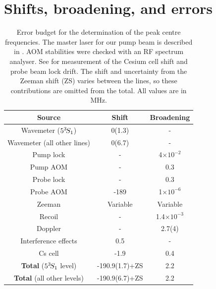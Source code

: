 

\section{Shifts, broadening, and errors}




\begin{table}
\centering
  \begin{tabular}{c c c}
      \hline\hline
          Source & Shift & Broadening  \\
      \hline
          Wavemeter ($5^{3\!} S_1$)& 0(1.3) & - \\
          Wavemeter (all other lines)& 0(6.7) & - \\
          Pump lock & - & 4$\times10^{-2}$ \\
          Pump AOM & - & 0.3 \\
          Probe lock & - & 0.3\\
          Probe AOM & -189 & 1$\times10^{-6}$\\
          Zeeman & Variable & Variable \\
          Recoil & - & 1.4$\times 10^{-3}$ \\ %
          Doppler & - & 2.7(4) \\
          Interference effects & 0.5 & - \\ 
          Cs cell & -1.9 & 0.4 \\
          \textbf{Total} ($5^{3\!} S_1$ level) & -190.9(1.7)+ZS& 2.2\\
          \textbf{Total} (all other levels) & -190.9(6.7)+ZS& 2.2\\
      \hline\hline
  \end{tabular}
\caption{Error budget for the determination of the peak centre frequencies.
	 The master laser for our pump beam is described in \cite{Shin16}.
	AOM stabilities were checked with an RF spectrum analyser.
	See \cite{Thomas20} for measurement of the Cesium cell shift and probe beam lock drift.
	The shift and uncertainty from the Zeeman shift (ZS) varies between the lines, so these contributions are omitted from the total.
	All values are in MHz.}
  \label{tab:errors}
  
\end{table}


